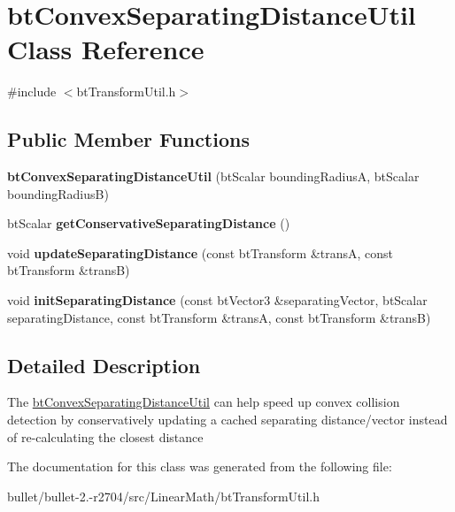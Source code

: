 \hypertarget{classbt_convex_separating_distance_util}{\section{bt\+Convex\+Separating\+Distance\+Util Class Reference}
\label{classbt_convex_separating_distance_util}
}


{\ttfamily \#include $<$bt\+Transform\+Util.\+h$>$}

\subsection*{Public Member Functions}
\begin{DoxyCompactItemize}
\item 
\hypertarget{classbt_convex_separating_distance_util_adb439e310a7a71ab9cee60ae7fb768e4}{{\bfseries bt\+Convex\+Separating\+Distance\+Util} (bt\+Scalar bounding\+Radius\+A, bt\+Scalar bounding\+Radius\+B)}\label{classbt_convex_separating_distance_util_adb439e310a7a71ab9cee60ae7fb768e4}

\item 
\hypertarget{classbt_convex_separating_distance_util_a9df92aa108854cb282454e9e1ab65b68}{bt\+Scalar {\bfseries get\+Conservative\+Separating\+Distance} ()}\label{classbt_convex_separating_distance_util_a9df92aa108854cb282454e9e1ab65b68}

\item 
\hypertarget{classbt_convex_separating_distance_util_af180e70e0e9c8a2c70445b43884be8a3}{void {\bfseries update\+Separating\+Distance} (const bt\+Transform \&trans\+A, const bt\+Transform \&trans\+B)}\label{classbt_convex_separating_distance_util_af180e70e0e9c8a2c70445b43884be8a3}

\item 
\hypertarget{classbt_convex_separating_distance_util_abb096b617a35cec57c2a7fdb24babfbf}{void {\bfseries init\+Separating\+Distance} (const bt\+Vector3 \&separating\+Vector, bt\+Scalar separating\+Distance, const bt\+Transform \&trans\+A, const bt\+Transform \&trans\+B)}\label{classbt_convex_separating_distance_util_abb096b617a35cec57c2a7fdb24babfbf}

\end{DoxyCompactItemize}


\subsection{Detailed Description}
The \hyperlink{classbt_convex_separating_distance_util}{bt\+Convex\+Separating\+Distance\+Util} can help speed up convex collision detection by conservatively updating a cached separating distance/vector instead of re-\/calculating the closest distance 

The documentation for this class was generated from the following file\+:\begin{DoxyCompactItemize}
\item 
bullet/bullet-\/2.-\/r2704/src/\+Linear\+Math/bt\+Transform\+Util.\+h\end{DoxyCompactItemize}
